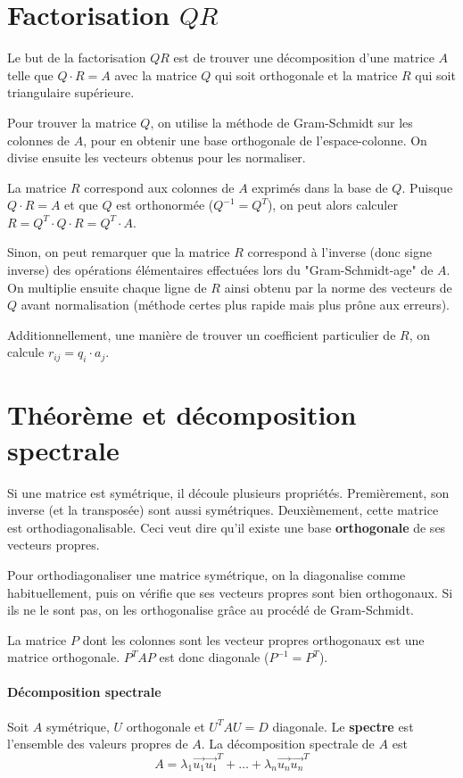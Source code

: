 \documentclass[10pt,a4paper]{book}
\begin{document}
\section{Factorisation \texorpdfstring{$QR$}{QR}}
Le but de la factorisation $QR$ est de trouver une décomposition d'une matrice $A$ telle que $Q\cdot R=A$ avec la matrice $Q$ qui soit orthogonale et la matrice $R$ qui soit triangulaire supérieure.\par 
Pour trouver la matrice $Q$, on utilise la méthode de Gram-Schmidt sur les colonnes de $A$, pour en obtenir une base orthogonale de l'espace-colonne. On divise ensuite les vecteurs obtenus pour les normaliser.\par 
La matrice $R$ correspond aux colonnes de $A$ exprimés dans la base de $Q$. Puisque $Q\cdot R=A$ et que $Q$ est orthonormée ($Q^{-1}=Q^T$), on peut alors calculer $R=Q^T\cdot Q\cdot R=Q^T\cdot A$. \par
Sinon, on peut remarquer que la matrice $R$ correspond à l'inverse (donc signe inverse) des opérations élémentaires effectuées lors du "Gram-Schmidt-age" de $A$. On multiplie ensuite chaque ligne de $R$ ainsi obtenu par la norme des vecteurs de $Q$ avant normalisation (méthode certes plus rapide mais plus prône aux erreurs).\par 
Additionnellement, une manière de trouver un coefficient particulier de $R$, on calcule $r_{ij} = q_i\cdot a_j$.

\section{Théorème et décomposition spectrale}
Si une matrice est symétrique, il découle plusieurs propriétés. Premièrement, son inverse (et la transposée) sont aussi symétriques. Deuxièmement, cette matrice est orthodiagonalisable. Ceci veut dire qu'il existe une base \textbf{orthogonale} de ses vecteurs propres.\par 
Pour orthodiagonaliser une matrice symétrique, on la diagonalise comme habituellement, puis on vérifie que ses vecteurs propres sont bien orthogonaux. Si ils ne le sont pas, on les orthogonalise grâce au procédé de Gram-Schmidt.\par 
La matrice $P$ dont les colonnes sont les vecteur propres orthogonaux est une matrice orthogonale. $P^TAP$ est donc diagonale ($P^{-1}=P^T$).
\paragraph{Décomposition spectrale} 
Soit $A$ symétrique, $U$ orthogonale et $U^TAU=D$ diagonale. Le \textbf{spectre} est l'ensemble des valeurs propres de $A$. La décomposition spectrale de $A$ est
\[A=\lambda_1\overrightarrow{u_1}\overrightarrow{u_1}^T+\ldots+\lambda_n\overrightarrow{u_n}\overrightarrow{u_n}^T\]
\end{document}
